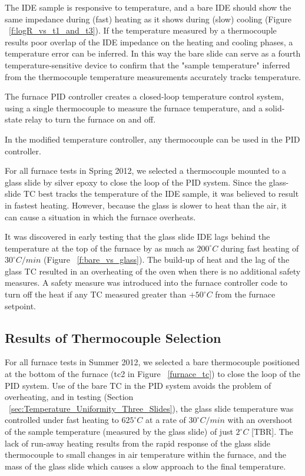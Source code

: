\documentclass[12pt,oneside,english]{article}
\begin{document}
    The IDE sample is responsive to temperature, and a bare IDE should show the same impedance during (fast) heating as it shows during (slow) cooling (Figure ~\ref{f:logR_vs_t1_and_t3}).  
    If the temperature measured by a thermocouple results poor overlap of the IDE impedance on the heating and cooling phases, a temperature error can be inferred.
    In this way the bare slide can serve as a fourth temperature-sensitive device to confirm that the "sample temperature" inferred from the thermocouple temperature measurements accurately tracks temperature.  
    
    The furnace PID controller creates a closed-loop temperature control system, using a single thermocouple to measure the furnace temperature, and a solid-state relay to turn the furnace on and off. 

    In the modified temperature controller, any thermocouple can be used in the PID controller.	
    
    For all furnace tests in Spring 2012, we selected a thermocouple mounted to a glass slide by silver epoxy to close the loop of the PID system.
    Since the glass-slide TC best tracks the temperature of the IDE sample, it was believed to result in fastest heating.
    However, because the glass is slower to heat than the air, it can cause a situation in which the furnace overheats. 
    
    It was discovered in early testing that the glass slide IDE lags behind the temperature at the top of the furnace by as much as $200^{\circ}C$ during fast heating of $30^{\circ}C/min$ (Figure ~\ref{f:bare_vs_glass}).  
    The build-up of heat and the lag of the glass TC resulted in an overheating of the oven when there is no additional safety measures.  
    A safety measure was introduced into the furnace controller code to turn off the heat if any TC measured greater than $+50^{\circ}C$ from the furnace setpoint.

\subsection*{Results of Thermocouple Selection}
    For all furnace tests in Summer 2012, we selected a bare thermocouple positioned at the bottom of the furnace (tc2 in Figure ~\ref{furnace_tc}) to close the loop of the PID system.
    Use of the bare TC in the PID system avoids the problem of overheating, and in testing (Section ~\ref{sec:Temperature_Uniformity_Three_Slides}), the glass slide temperature was controlled under fast heating to $625^{\circ}C$ at a rate of $30^{\circ}C/min$ with an overshoot of the sample temperature (measured by the glass slide) of just $2^{\circ}C$  [TBR].  
    The lack of run-away heating results from the rapid response of the glass slide thermocouple to small changes in air temperature within the furnace, and the mass of the glass slide which causes a slow approach to the final temperature.
\end{document}
